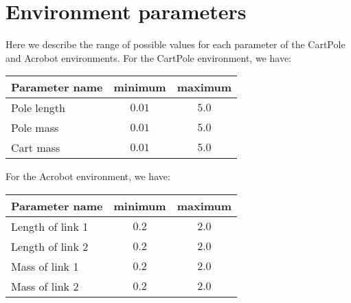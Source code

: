 \section{Environment parameters} %
\label{sec:environment_parameters}
Here we describe the range of possible values for each parameter of the CartPole and Acrobot environments. For the CartPole environment, we have:
\begin{table}[H]
    \centering
    \begin{tabular}{l|cc}
    \hline
    \textbf{Parameter name} & \textbf{minimum} & \textbf{maximum} \\
    \hline
        Pole length & $0.01$ & $5.0$ \\
        Pole mass & $0.01$ & $5.0$ \\
        Cart mass & $0.01$ & $5.0$ \\
    \hline
    \end{tabular}
\end{table}
For the Acrobot environment, we have:
\begin{table}[H]
    \centering
    \begin{tabular}{l|cc}
    \hline
    \textbf{Parameter name} & \textbf{minimum} & \textbf{maximum} \\
    \hline
        Length of link 1 & $0.2$ & $2.0$ \\
        Length of link 2 & $0.2$ & $2.0$ \\
        Mass of link 1 & $0.2$ & $2.0$ \\
        Mass of link 2 & $0.2$ & $2.0$ \\
    \hline
    \end{tabular}
\end{table}

